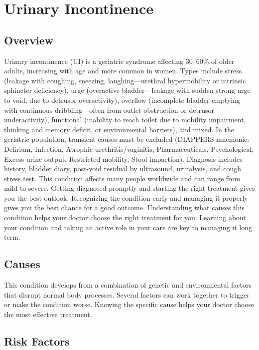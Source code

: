 \chapter{Urinary Incontinence}
\label{sec:geriatric:Urinary Incontinence}

\section{Overview}
Urinary incontinence (UI) is a geriatric syndrome affecting 30--60\% of older adults, increasing with age and more common in women. Types include stress (leakage with coughing, sneezing, laughing---urethral hypermobility or intrinsic sphincter deficiency), urge (overactive bladder---leakage with sudden strong urge to void, due to detrusor overactivity), overflow (incomplete bladder emptying with continuous dribbling---often from outlet obstruction or detrusor underactivity), functional (inability to reach toilet due to mobility impairment, thinking and memory deficit, or environmental barriers), and mixed. In the geriatric population, transient causes must be excluded (DIAPPERS mnemonic: Delirium, Infection, Atrophic urethritis/vaginitis, Pharmaceuticals, Psychological, Excess urine output, Restricted mobility, Stool impaction). Diagnosis includes history, bladder diary, post-void residual by ultrasound, urinalysis, and cough stress test. This condition affects many people worldwide and can range from mild to severe. Getting diagnosed promptly and starting the right treatment gives you the best outlook. Recognizing the condition early and managing it properly gives you the best chance for a good outcome. Understanding what causes this condition helps your doctor choose the right treatment for you. Learning about your condition and taking an active role in your care are key to managing it long term.

\section{Causes}
This condition develops from a combination of genetic and environmental factors that disrupt normal body processes. Several factors can work together to trigger or make the condition worse. Knowing the specific cause helps your doctor choose the most effective treatment.

\section{Risk Factors}

